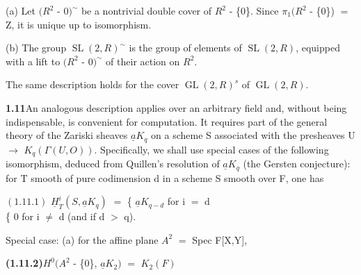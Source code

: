 \documentclass[10pt,a4paper]{article}
\begin{document}
\par (a) Let $(R^2$ - ${0})^\sim$ be a nontrivial double cover of $R^2$ - \{0\}. Since $\pi{}_1(R^2$ - \{0\}) $=$ Z, it is unique up to isomorphism.\par
\par (b) The group $\operatorname{SL}(2,R)^\sim$ is the group of elements of $\operatorname{SL}(2,R)$, equipped with a lift to $(R^2$ - ${0})^\sim$ of their action on $R^2$.\par
\par The same description holds for the cover $\operatorname{GL}(2,R)^s$ of $\operatorname{GL}(2,R)$.\par
\par\noindent\textbf{1.11}\quad An analogous description applies over an arbitrary field and, without being indispensable, is convenient for computation. It requires part of the general theory of the Zariski sheaves $\underline{a}K_q$ on a scheme S associated with the presheaves U $\to{}$ $K_q(\Gamma{}(U,O))$. Specifically, we shall use special cases of the following isomorphism, deduced from Quillen's resolution of $\underline{a}K_q$ (the Gersten conjecture): for T smooth of pure codimension d in a scheme S smooth over F, one has\par
\par\smallskip\begin{center}\begin{minipage}{0.96\textwidth}\centering
$(1.11.1)$ $\underline{H}_T^i(S,\underline{a}K_q)$ $=$ \{ $\underline{a}K_{q-d}$ for i $=$ d \\ \{ 0 for i $\ne{}$ d (and if d $>$ q).
\end{minipage}\end{center}\smallskip
\par Special case: (a) for the affine plane $A^2$ $=$ Spec F[X,Y],\par
\par\noindent\textbf{(1.11.2)}\quad $H^0(A^2$ - \{0\}, $\underline{a}K_2)$ $=$ $K_2(F)$\par
\end{document}
